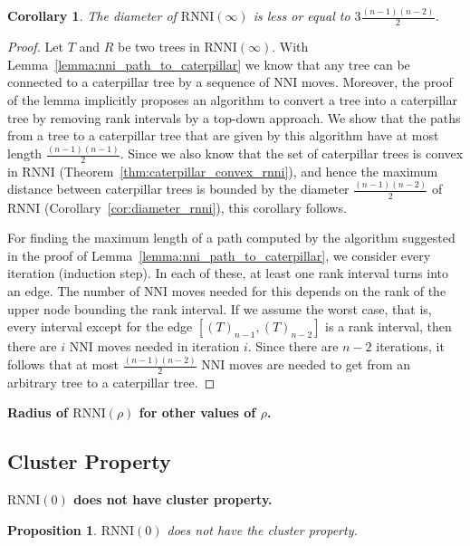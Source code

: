\documentclass[11pt]{amsart}
\newtheorem{proposition}{Proposition}
\newtheorem{corollary}{Corollary}
\newcommand{\rnni}{\mathrm{RNNI}}
\newcommand{\nni}{\mathrm{NNI}}
\newcommand{\summary}[1]{\textbf{#1}} %
\begin{document}
\begin{corollary}
	The diameter of $\rnni(\infty)$ is less or equal to $3 \frac{(n-1)(n-2)}{2}$.
\end{corollary}

\begin{proof}
	Let $T$ and $R$ be two trees in $\rnni(\infty)$.
	With Lemma~\ref{lemma:nni_path_to_caterpillar} we know that any tree can be connected to a caterpillar tree by a sequence of $\nni$ moves.
	Moreover, the proof of the lemma implicitly proposes an algorithm to convert a tree into a caterpillar tree by removing rank intervals by a top-down approach.
	We show that the paths from a tree to a caterpillar tree that are given by this algorithm have at most length $\frac{(n-1)(n-1)}{2}$.
	Since we also know that the set of caterpillar trees is convex in $\rnni$ (Theorem~\ref{thm:caterpillar_convex_rnni}), and hence the maximum distance between caterpillar trees is bounded by the diameter $\frac{(n-1)(n-2)}{2}$ of $\rnni$ (Corollary~\ref{cor:diameter_rnni}), this corollary follows.

	For finding the maximum length of a path computed by the algorithm suggested in the proof of Lemma~\ref{lemma:nni_path_to_caterpillar}, we consider every iteration (induction step).
	In each of these, at least one rank interval turns into an edge.
	The number of $\nni$ moves needed for this depends on the rank of the upper node bounding the rank interval.
	If we assume the worst case, that is, every interval except for the edge $[(T)_{n-1},(T)_{n-2}]$ is a rank interval, then there are $i$ $\nni$ moves needed in iteration $i$.
	Since there are $n-2$ iterations, it follows that at most $\frac{(n-1)(n-2)}{2}$ $\nni$ moves are needed to get from an arbitrary tree to a caterpillar tree.
\end{proof}

\summary{Radius of $\rnni(\rho)$ for other values of $\rho$.}

\subsection{Cluster Property}

\summary{$\rnni(0)$ does not have cluster property.}
\begin{proposition}
	$\rnni(0)$ does not have the cluster property.
\end{proposition}
\end{document}

